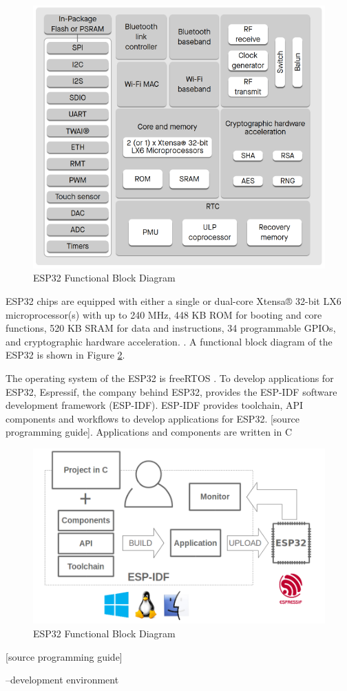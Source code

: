 \begin{figure}
	\centering
	\includegraphics[scale=.5]{abbildungen/functional-block-diagram}
	\caption{ESP32 Functional Block Diagram}
	\label{Fig:esp32-crypto}
\end{figure}

ESP32 chips are equipped with either a single or dual-core Xtensa® 32-bit LX6 microprocessor(s) with up to 240 MHz, 448 KB ROM for booting and core functions, 520 KB SRAM for data and instructions, 34 programmable GPIOs, and cryptographic hardware acceleration. \cite[4-5]{esp32-series}. A functional block diagram of the ESP32 is shown in Figure \ref{Fig:esp32-crypto}. 

The operating system of the ESP32 is freeRTOS \cite[6]{esp32-module}. To develop applications for ESP32, Espressif, the company behind ESP32, provides the ESP-IDF software development framework (ESP-IDF). ESP-IDF provides toolchain, API components and workflows to develop applications for ESP32.
[source programming guide]. Applications and components are written in C 

\begin{figure}
	\centering
	\includegraphics[scale=.5]{abbildungen/esp-idf.png}
	\caption{ESP32 Functional Block Diagram}
	\label{Fig:esp32-crypto}
\end{figure}
[source programming guide]



--development environment


